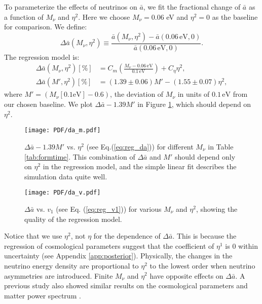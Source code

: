 To parameterize the effects of neutrinos on $\bar a$, we fit the fractional change of $\bar a$ as a function of $M_\nu$ and $\eta^2$. Here we choose $M_\nu = 0.06$ eV and $\eta^2=0$ as the baseline for comparison. We define:
\begin{equation}
    \Delta \bar a(M_\nu,\eta^2) \equiv \frac{\bar a(M_\nu, \eta^2) - \bar a(0.06\mathrm{ \,eV}, 0)}{\bar a(0.06\mathrm{\,eV}, 0)}.
\end{equation}
The regression model is:
\begin{align}
\label{eq:reg_da}
    \Delta \bar a(M_\nu,\eta^2) [\%] &= C_m \left(\frac{M_\nu-0.06\mathrm{\, eV}}{0.1\mathrm{\, eV}}\right) + C_\eta\eta^2, \nonumber \\
    \Delta \bar a(M',\eta^2) [\%]&= (1.39\pm0.06)M' -(1.55\pm0.07)\eta^2,
\end{align}
where $M'=(M_\nu[\mathrm{0.1eV}]-0.6)$, the deviation of $M_\nu$ in units of $0.1\,\mathrm{eV}$ from our chosen baseline. We plot $\Delta \bar{a} - 1.39 M'$ in Figure \ref{fig:da_m}, which should depend on $\eta^2$.

\begin{figure}[!h]
		\begin{center}%
		\texttt{[image: PDF/da\_m.pdf]}
		\caption{$\Delta \bar a - 1.39M'$ vs. $\eta^2$ (see Eq.(\ref{eq:reg_da})) for different $M_\nu$ in Table \ref{tab:formtime}. This combination of $\Delta \bar a$ and $M'$ should depend only on $\eta^2$ in the regression model, and the simple linear fit describes the simulation data quite well.}
		\label{fig:da_m}
		\end{center}
\end{figure}
\begin{figure}[!h]
		\begin{center}%
		\texttt{[image: PDF/da\_v.pdf]}
		\caption{$\Delta {\bar a}$ vs. $v_1$ (see Eq. (\ref{eq:reg_v1})) for various $M_\nu$ and $\eta^2$, showing the quality of the regression model.}
		\label{fig:da_v}
		\end{center}
\end{figure}




Notice that we use $\eta^2$, not $\eta$ for the dependence of $\Delta \bar a$. 
This is because the regression of cosmological parameters suggest that the coefficient of $\eta^1$ is 0 within uncertainty (see Appendix \ref{app:posterior}).
Physically, the changes in the neutrino energy density are proportional to $\eta^2$ to the lowest order when neutrino asymmetries are introduced.
Finite $M_\nu$ and $\eta^2$ have opposite effects on $\Delta \bar a$. A previous study also showed similar results on the cosmological parameters and matter power spectrum \cite{Carton}.


